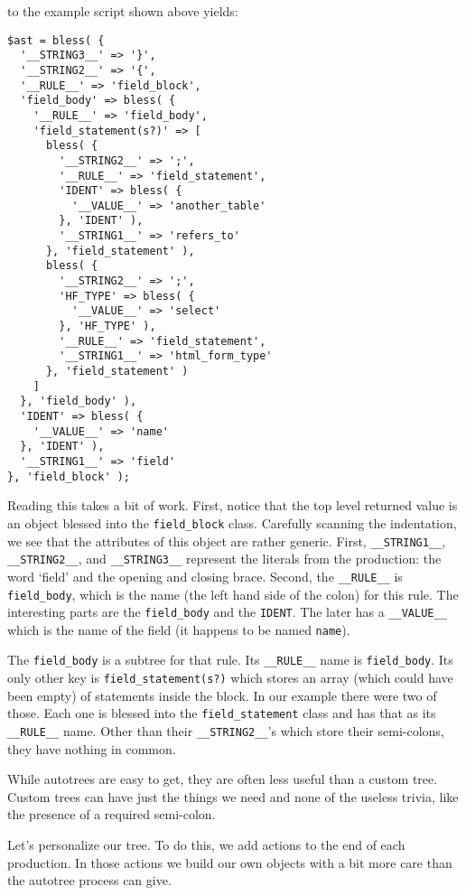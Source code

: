 to the example script shown above yields:

\begin{verbatim}
$ast = bless( {
  '__STRING3__' => '}',
  '__STRING2__' => '{',
  '__RULE__' => 'field_block',
  'field_body' => bless( {
    '__RULE__' => 'field_body',
    'field_statement(s?)' => [
      bless( {
        '__STRING2__' => ';',
        '__RULE__' => 'field_statement',
        'IDENT' => bless( {
          '__VALUE__' => 'another_table'
        }, 'IDENT' ),
        '__STRING1__' => 'refers_to'
      }, 'field_statement' ),
      bless( {
        '__STRING2__' => ';',
        'HF_TYPE' => bless( {
          '__VALUE__' => 'select'
        }, 'HF_TYPE' ),
        '__RULE__' => 'field_statement',
        '__STRING1__' => 'html_form_type'
      }, 'field_statement' )
    ]
  }, 'field_body' ),
  'IDENT' => bless( {
    '__VALUE__' => 'name'
  }, 'IDENT' ),
  '__STRING1__' => 'field'
}, 'field_block' );
\end{verbatim}

Reading this takes a bit of work.  First, notice that the top level
returned value is an object blessed into the \verb+field_block+ class.
Carefully scanning the indentation, we see that the attributes of this
object are rather generic.  First, \verb+__STRING1__+, \verb+__STRING2__+,
and \verb+__STRING3__+ represent the literals from the production: the word
`field' and the opening and closing brace.  Second, the \verb+__RULE__+
is \verb+field_body+, which is the name (the left hand side of the colon)
for this rule.  The interesting parts are the \verb+field_body+ and
the \verb+IDENT+.  The later has a \verb+__VALUE__+ which is the name
of the field (it happens to be named \verb+name+).

The \verb+field_body+ is a subtree for that rule.  Its \verb+__RULE__+ name
is \verb+field_body+.  Its only other key is \verb+field_statement(s?)+
which stores an array (which could have been empty) of statements inside
the block.  In our example there were two of those.  Each one is
blessed into the \verb+field_statement+ class and has that as its
\verb+__RULE__+ name.  Other than their \verb+__STRING2__+'s which
store their semi-colons, they have nothing in common.

While autotrees are easy to get, they are often less useful than a custom
tree.  Custom trees can have just the things we need and none of the
useless trivia, like the presence of a required semi-colon.

Let's personalize our tree.  To do this, we add actions to the end of
each production.  In those actions we build our own objects with a bit
more care than the autotree process can give.

